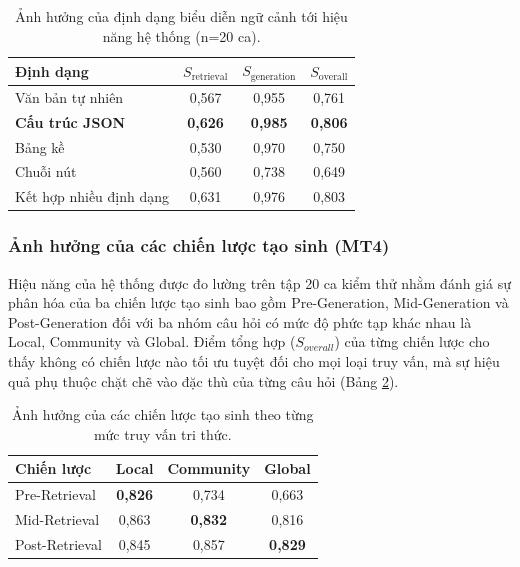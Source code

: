 \begin{table}[h]
\centering
\caption{Ảnh hưởng của định dạng biểu diễn ngữ cảnh tới hiệu năng hệ thống (n=20 ca).}
\label{tab:format_results}
\begin{tabular}{lccc}
\hline
\textbf{Định dạng} & \textbf{$S_{\text{retrieval}}$} & \textbf{$S_{\text{generation}}$} & \textbf{$S_{\text{overall}}$} \\
\hline
Văn bản tự nhiên        & 0,567 & 0,955 & 0,761 \\
\textbf{Cấu trúc JSON}  & \textbf{0,626} & \textbf{0,985} & \textbf{0,806} \\
Bảng kề                 & 0,530 & 0,970 & 0,750 \\
Chuỗi nút               & 0,560 & 0,738 & 0,649 \\
Kết hợp nhiều định dạng & 0,631 & 0,976 & 0,803 \\
\hline
\end{tabular}
\end{table}

\subsubsection{Ảnh hưởng của các chiến lược tạo sinh (MT4)}

Hiệu năng của hệ thống được đo lường trên tập 20 ca kiểm thử nhằm đánh giá sự phân hóa của ba chiến lược tạo sinh bao gồm Pre-Generation, Mid-Generation và Post-Generation đối với ba nhóm câu hỏi có mức độ phức tạp khác nhau là Local, Community và Global. Điểm tổng hợp ($S_{overall}$) của từng chiến lược cho thấy không có chiến lược nào tối ưu tuyệt đối cho mọi loại truy vấn, mà sự hiệu quả phụ thuộc chặt chẽ vào đặc thù của từng câu hỏi (Bảng \ref{tab:generation_strategy_results}).

\begin{table}[h]
\centering
\caption{Ảnh hưởng của các chiến lược tạo sinh theo từng mức truy vấn tri thức.}
\label{tab:generation_strategy_results}
\begin{tabular}{lccc}
\hline
\textbf{Chiến lược} & \textbf{Local} & \textbf{Community} & \textbf{Global} \\
\hline
Pre-Retrieval  & \textbf{0,826} & 0,734 & 0,663 \\
Mid-Retrieval  & 0,863 & \textbf{0,832} & 0,816 \\
Post-Retrieval & 0,845 & 0,857 & \textbf{0,829} \\
\hline
\end{tabular}
\end{table}

